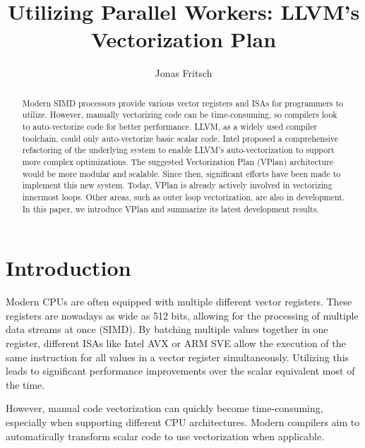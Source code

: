 \documentclass[sigplan,11pt,nonacm]{acmart}
\begin{document}
\title[State of LLVM's Vectorization Plan]{Utilizing Parallel Workers: LLVM's Vectorization Plan}
\author{Jonas Fritsch}

\begin{abstract}
  Modern SIMD processors provide various vector registers and ISAs for programmers to utilize. 
  However, manually vectorizing code can be time-consuming, so compilers look to auto-vectorize 
  code for better performance. LLVM, as a widely used compiler toolchain, could only auto-vectorize 
  basic scalar code. Intel proposed a comprehensive refactoring of the underlying system to enable 
  LLVM's auto-vectorization to support more complex optimizations. The suggested Vectorization Plan 
  (VPlan) architecture would be more modular and scalable. Since then, significant efforts have been 
  made to implement this new system. Today, VPlan is already actively involved in vectorizing 
  innermost loops. Other areas, such as outer loop vectorization, are also in development.
  In this paper, we introduce VPlan and summarize its latest development results.
\end{abstract}

\maketitle



\section{Introduction}
\label{sec:introduction}
Modern CPUs are often equipped with multiple different vector registers. These registers are nowadays 
as wide as 512 bits, allowing for the processing of multiple data streams at once (SIMD). By 
batching multiple values together in one register, different ISAs like Intel AVX or ARM SVE allow 
the execution of the same instruction for all values in a vector register simultaneously. 
Utilizing this leads to significant performance improvements over the scalar equivalent most of 
the time.

However, manual code vectorization can quickly become time-consuming, especially when
supporting different CPU architectures. Modern compilers aim to automatically transform scalar code
to use vectorization when applicable.
\end{document}
